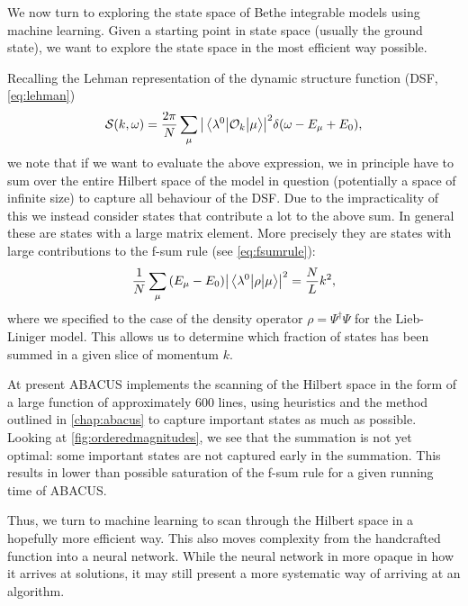 \documentclass[11pt, a4paper]{report} %
\begin{document}
We now turn to exploring the state space of Bethe integrable models using machine learning.
Given a starting point in state space (usually the ground state), we want to explore the state space in the most efficient way possible.

Recalling the Lehman representation of the dynamic structure function (DSF, \cref{eq:lehman})
\begin{equation}
  \mathcal{S}(k,\omega) = \frac{2\pi}{N}\sum_{\mu}\abs{\mel{\lambda^0}{\mathcal{O}_k}{\mu}}^2 \delta\qty(\omega-E_{\mu}+E_0), 
\end{equation}
we note that if we want to evaluate the above expression, we in principle have to sum over the entire Hilbert space of the model in question (potentially a space of  infinite size) to capture all behaviour of the DSF.\@
Due to the impracticality of this we instead consider states that contribute a lot to the above sum.
In general these are states with a large matrix element.
More precisely they are states with large contributions to the f-sum rule (see \cref{eq:fsumrule}):
\begin{align}
  \frac{1}{N}\sum_{\mu}\qty(E_{\mu}-E_0)\abs{\mel{\lambda^0}{\rho}{\mu}}^2  = \frac{N}{L} k^2,
\end{align}
where we specified to the case of the density operator \(\rho = \Psi^{\dag}\Psi\) for the Lieb-Liniger model.
This allows us to determine which fraction of states has been summed in a given slice of momentum \(k\).

At present ABACUS implements the scanning of the Hilbert space in the form of a large function of approximately 600 lines, using heuristics and the method outlined in \cref{chap:abacus} to capture important states as much as possible.
Looking at \cref{fig:orderedmagnitudes}, we see that the summation is not yet optimal: some important states are not captured early in the summation.
This results in lower than possible saturation of the f-sum rule for a given running time of ABACUS.\@

Thus, we turn to machine learning to scan through the Hilbert space in a hopefully more efficient way.
This also moves complexity from the handcrafted function into a neural network.
While the neural network in more opaque in how it arrives at solutions, it may still present a more systematic way of arriving at an algorithm.
\end{document}
